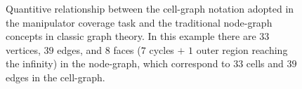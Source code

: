 \documentclass[journal]{IEEEtran}
\begin{document}
\begin{figure}[t]
\centering
{}
\caption{Quantitive relationship between the cell-graph notation adopted in the manipulator coverage task and the traditional node-graph concepts in classic graph theory. In this example there are $33$ vertices, $39$ edges, and $8$ faces ($7$ cycles $+$ $1$ outer region reaching the infinity) in the node-graph, which correspond to $33$ cells and $39$ edges in the cell-graph. }
\label{fig:node_graph}
\end{figure}
\end{document}
